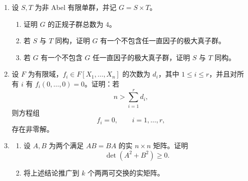\documentclass[UTF8,12pt]{ctexart}
\begin{document}
\begin{enumerate}[label=\textbf{\arabic*.},leftmargin=2.2em]
\item 设 \(S,T\) 为非 Abel 有限单群，并记 \(G=S\times T\)。
\begin{enumerate}[label=\textbf{(\alph*)},leftmargin=2.4em]
\item 证明 \(G\) 的正规子群总数为 \(4\)。
\item 若 \(S\) 与 \(T\) 同构，证明 \(G\) 有一个不包含任一直因子的极大真子群。
\item 若 \(G\) 有一个不包含 \(G\) 任一直因子的极大真子群，证明 \(S\) 与 \(T\) 同构。
\end{enumerate}

\item 设 \(F\) 为有限域，\(f_i\in F[X_1,\ldots,X_n]\) 的次数为 \(d_i\)，其中 \(1\le i\le r\)，并且对所有 \(i\) 有 \(f_i(0,\ldots,0)=0\)。证明：若
\[
n>\sum_{i=1}^r d_i,
\]
则方程组
\[
f_i=0,\qquad i=1,\ldots,r,
\]
存在非零解。

\item
\begin{enumerate}[label=\textbf{(\alph*)},leftmargin=2.4em]
\item 设 \(A,B\) 为两个满足 \(AB=BA\) 的实 \(n\times n\) 矩阵。证明
\[
\det(A^2+B^2)\ge0.
\]
\item 将上述结论推广到 \(k\) 个两两可交换的实矩阵。
\end{enumerate}
\end{enumerate}
\end{document}
